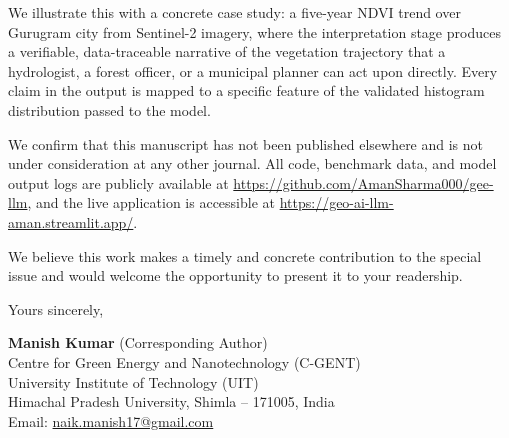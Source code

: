 \documentclass[12pt]{article}
\begin{document}
We illustrate this with a concrete case study: a five-year NDVI trend over Gurugram city from Sentinel-2 imagery, where the interpretation stage produces a verifiable, data-traceable narrative of the vegetation trajectory that a hydrologist, a forest officer, or a municipal planner can act upon directly. Every claim in the output is mapped to a specific feature of the validated histogram distribution passed to the model.

We confirm that this manuscript has not been published elsewhere and is not under consideration at any other journal. All code, benchmark data, and model output logs are publicly available at \url{https://github.com/AmanSharma000/gee-llm}, and the live application is accessible at \url{https://geo-ai-llm-aman.streamlit.app/}.

We believe this work makes a timely and concrete contribution to the special issue and would welcome the opportunity to present it to your readership.

\bigskip

Yours sincerely,

\bigskip
\textbf{Manish Kumar} (Corresponding Author)\\
Centre for Green Energy and Nanotechnology (C-GENT)\\
University Institute of Technology (UIT)\\
Himachal Pradesh University, Shimla -- 171005, India\\
Email: \href{mailto:naik.manish17@gmail.com}{naik.manish17@gmail.com}
\end{document}
